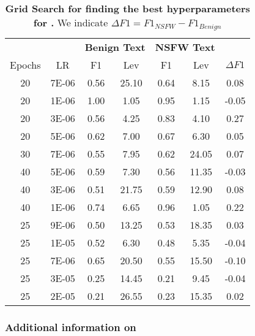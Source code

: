 \setlength{\tabcolsep}{3.5pt}
\renewcommand{\mycolspace}{1.5pt}
\addtolength{\tabcolsep}{-\mycolspace} 
\begin{table}[h!]
    \centering
    \begin{tabular}{cc|cc|cc|c}
    \toprule
        & & \multicolumn{2}{c}{\textbf{Benign Text}} & \multicolumn{2}{c}{\textbf{NSFW Text}} &\\
        Epochs & LR & F1 & Lev & F1 & Lev & $\Delta F1$ \\
    \midrule
    20 & 7E-06  & 0.56 & 25.10 & 0.64 & 8.15  &  0.08 \\
    20 & 1E-06  & 1.00 & 1.05  & 0.95 & 1.15  & -0.05 \\
    20 & 3E-06  & 0.56 & 4.25  & 0.83 & 4.10  &  0.27 \\
    20 & 5E-06  & 0.62 & 7.00  & 0.67 & 6.30  &  0.05 \\
    30 & 7E-06  & 0.55 & 7.95  & 0.62 & 24.05 &  0.07 \\
    40 & 5E-06  & 0.59 & 7.30  & 0.56 & 11.35 & -0.03 \\
    40 & 3E-06  & 0.51 & 21.75 & 0.59 & 12.90 &  0.08 \\
    40 & 1E-06  & 0.74 & 6.65  & 0.96 & 1.05  &  0.22 \\
    25 & 9E-06  & 0.50 & 13.25 & 0.53 & 18.35 &  0.03 \\
    25 & 1E-05  & 0.52 & 6.30  & 0.48 & 5.35  & -0.04 \\
    25 & 7E-06  & 0.65 & 20.50 & 0.55 & 15.50 & -0.10 \\
    25 & 3E-05  & 0.25 & 14.45 & 0.21 & 9.45  & -0.04 \\
    25 & 2E-05  & 0.21 & 26.55 & 0.23 & 15.35 &  0.02 \\
    \bottomrule
    \end{tabular}
    \caption{\textbf{Grid Search for finding the best hyperparameters for \ours.} We indicate $\Delta F1 = F1_{NSFW} - F1_{Benign}$}
    \label{tab:hyper_search}
\end{table}
\setlength{\tabcolsep}{\mycolspace}



\subsubsection{Additional information on \bench}

